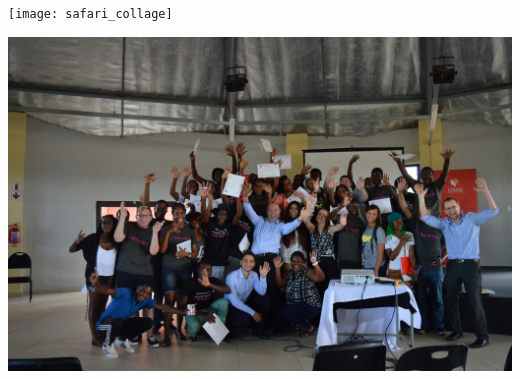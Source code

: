 \documentclass{beamer}
\begin{document}
\begin{frame}
\begin{center}
\texttt{[image: safari\_collage]}
\end{center}
\end{frame}


\begin{frame}
\begin{center}
\includegraphics[width=\textwidth]{end}
\end{center}
\end{frame}
\end{document}
